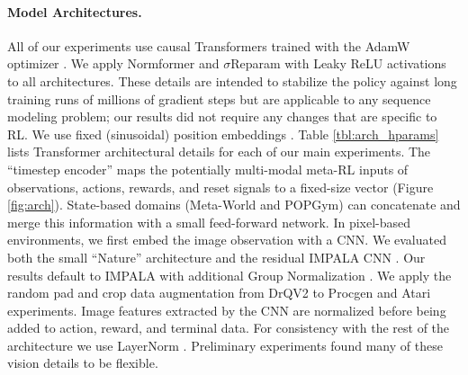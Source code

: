 \documentclass{article}
\begin{document}
\paragraph{Model Architectures.} All of our experiments use causal Transformers trained with the AdamW optimizer \cite{loshchilov2017decoupled}. We apply Normformer \cite{shleifer2021normformer} and $\sigma$Reparam \cite{zhai2023stabilizing} with Leaky ReLU activations to all architectures. These details are intended to stabilize the policy against long training runs of millions of gradient steps but are applicable to any sequence modeling problem; our results did not require any changes that are specific to RL. We use fixed (sinusoidal) position embeddings \cite{vaswani2017attention}. Table \ref{tbl:arch_hparams} lists Transformer architectural details for each of our main experiments. The ``timestep encoder'' maps the potentially multi-modal meta-RL inputs of observations, actions, rewards, and reset signals to a fixed-size vector (Figure \ref{fig:arch}). State-based domains (Meta-World and POPGym) can concatenate and merge this information with a small feed-forward network. In pixel-based environments, we first embed the image observation with a CNN. We evaluated both the small ``Nature'' architecture \cite{mnih2015human} and the residual IMPALA CNN \cite{espeholt2018impala}. Our results default to IMPALA with additional Group Normalization \cite{wu2018group, kumar2022offline}. We apply the random pad and crop data augmentation from DrQV2 \cite{yarats2021mastering} to Procgen and Atari experiments. Image features extracted by the CNN are normalized before being added to action, reward, and terminal data. For consistency with the rest of the architecture we use LayerNorm \cite{ba2016layer}. Preliminary experiments found many of these vision details to be flexible.
\end{document}
